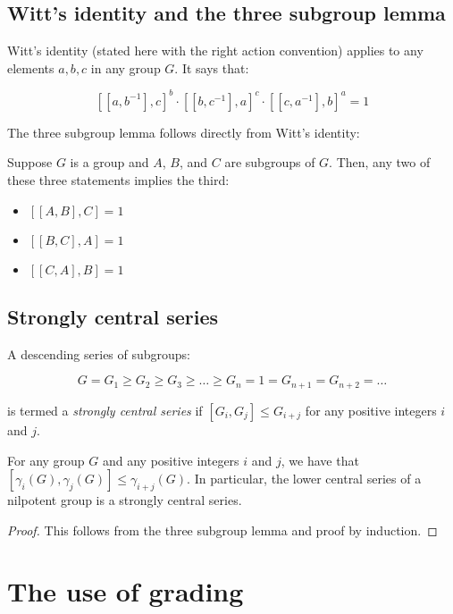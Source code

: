 \subsection{Witt's identity and the three subgroup lemma}\label{appsec:witt-three-subgroup}

Witt's identity (stated here with the right action convention) applies
to any elements $a,b,c$ in any group $G$. It says that:

$$[[a,b^{-1}],c]^b \cdot [[b,c^{-1}],a]^c \cdot [[c,a^{-1}],b]^a  = 1$$

The three subgroup lemma follows directly from Witt's identity:

\begin{lemma}
  Suppose $G$ is a group and $A$, $B$, and $C$ are subgroups of
  $G$. Then, any two of these three statements implies the third:

  \begin{itemize}
  \item $[[A,B],C] = 1$
  \item $[[B,C],A] = 1$
  \item $[[C,A],B] = 1$
  \end{itemize}
\end{lemma}

\subsection{Strongly central series}

A descending series of subgroups:

$$G = G_1 \ge G_2 \ge G_3 \ge \dots \ge G_n = 1 = G_{n+1} = G_{n+2} = \dots$$

is termed a {\em strongly central series} if $[G_i,G_j] \le G_{i+j}$
for any positive integers $i$ and $j$.

\begin{lemma}
  For any group $G$ and any positive integers $i$ and $j$, we have
  that $[\gamma_i(G),\gamma_j(G)] \le \gamma_{i+j}(G)$. In particular,
  the lower central series of a nilpotent group is a strongly central series.
\end{lemma}

\begin{proof}
  This follows from the three subgroup lemma and proof by induction.
\end{proof}


\section{The use of grading}

